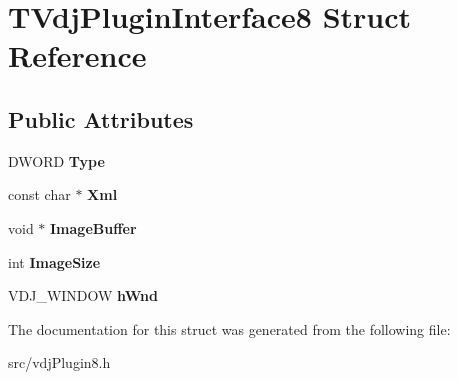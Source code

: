 \hypertarget{structTVdjPluginInterface8}{}\section{T\+Vdj\+Plugin\+Interface8 Struct Reference}
\label{structTVdjPluginInterface8}
\subsection*{Public Attributes}
\begin{DoxyCompactItemize}
\item 
\mbox{\label{structTVdjPluginInterface8_a58e11db37bdc4344555b73667bcb4d39}} 
D\+W\+O\+RD {\bfseries Type}
\item 
\mbox{\label{structTVdjPluginInterface8_ae74d30940f371b9dc052abbecd6f3ca1}} 
const char $\ast$ {\bfseries Xml}
\item 
\mbox{\label{structTVdjPluginInterface8_a439ca76f75e47ea95368e3fdd3f76af0}} 
void $\ast$ {\bfseries Image\+Buffer}
\item 
\mbox{\label{structTVdjPluginInterface8_a3657e0318201799f7766ec4baba95b6b}} 
int {\bfseries Image\+Size}
\item 
\mbox{\label{structTVdjPluginInterface8_ac34246d8ef349c55e342b36facb5fed9}} 
V\+D\+J\+\_\+\+W\+I\+N\+D\+OW {\bfseries h\+Wnd}
\end{DoxyCompactItemize}


The documentation for this struct was generated from the following file\+:\begin{DoxyCompactItemize}
\item 
src/vdj\+Plugin8.\+h\end{DoxyCompactItemize}
